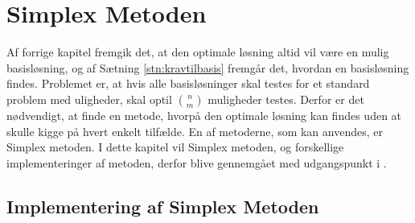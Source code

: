 \chapter{Simplex Metoden}\label{chap:simp}
Af forrige kapitel fremgik det, at den optimale løsning altid vil være en mulig basisløsning, og af Sætning \ref{stn:kravtilbasis}
fremgår det, hvordan en basisløsning findes. 
Problemet er, at hvis alle basisløsninger skal testes for et standard problem med uligheder, skal optil $\binom{n}{m}$ muligheder testes. 
Derfor er det nødvendigt, at finde en metode, hvorpå den optimale løsning kan findes uden at skulle kigge på hvert enkelt tilfælde. 
En af metoderne, som kan anvendes, er Simplex metoden. I dette kapitel vil Simplex metoden, og forskellige implementeringer af metoden, derfor blive gennemgået med udgangspunkt i .



\section{Implementering af Simplex Metoden}



